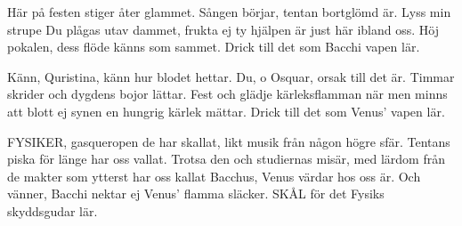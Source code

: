 

\author{}





\author{}





\melo{}
\author{}





\author{Dum-Dum 1977}

\songtext{}Här på festen stiger åter glammet.
Sången börjar, tentan bortglömd är.
Lyss min strupe Du plågas utav dammet,
frukta ej ty hjälpen är just här
ibland oss.
Höj pokalen, dess flöde känns som sammet.
Drick till det som Bacchi vapen lär.

Känn, Quristina, känn hur blodet hettar.
Du, o Osquar, orsak till det är.
Timmar skrider och dygdens bojor lättar.
Fest och glädje kärleksflamman när
men minns att
blott ej synen en hungrig kärlek mättar.
Drick till det som Venus' vapen lär.

FYSIKER, gasqueropen de har skallat,
likt musik från någon högre sfär.
Tentans piska för länge har oss vallat.
Trotsa den och studiernas misär,
med lärdom
från de makter som ytterst har oss kallat
Bacchus, Venus värdar hos oss är.
Och vänner,
Bacchi nektar ej Venus' flamma släcker.
SKÅL för det Fysiks skyddsgudar lär.





